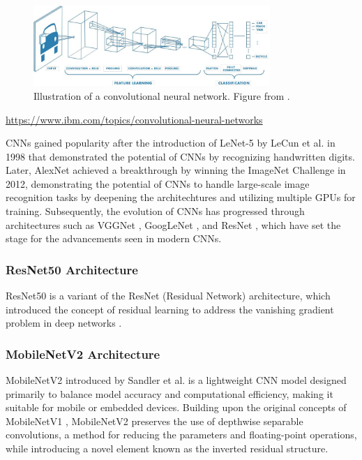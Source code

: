 \begin{figure}[ht]
    \centering
    \includegraphics[width=0.8\textwidth]{Images/CNN_illustration.jpg} 
    \caption{Illustration of a convolutional neural network. Figure from \cite{mathworks_cnn}. }
    \label{fig:cnn_illustration}
\end{figure}

\url{https://www.ibm.com/topics/convolutional-neural-networks}

CNNs gained popularity after the introduction of LeNet-5 by LeCun et al. in 1998 \cite{lecun1998} that demonstrated the potential of CNNs by recognizing handwritten digits. Later, AlexNet \cite{NIPS2012_c399862d} achieved a breakthrough by winning the ImageNet Challenge in 2012, demonstrating the potential of CNNs to handle large-scale image recognition tasks by deepening the architechtures and utilizing multiple GPUs for training. Subsequently, the evolution of CNNs has progressed through architectures such as VGGNet \cite{simonyan2015deepconvolutionalnetworkslargescale}, GoogLeNet \cite{szegedy2014goingdeeperconvolutions}, and ResNet \cite{he2016}, which have set the stage for the advancements seen in modern CNNs.


\subsubsection{ResNet50 Architecture}
\label{sec:resnet}
ResNet50 is a variant of the ResNet (Residual Network) architecture, which introduced the concept of residual learning to address the vanishing gradient problem in deep networks \cite{he2016}. 




\subsubsection{MobileNetV2 Architecture}
\label{sec:mobilenet}
MobileNetV2 introduced by Sandler et al. \cite{sandler2018mobilenetv2} is a lightweight CNN model designed primarily to balance model accuracy and computational efficiency, making it suitable for mobile or embedded devices. Building upon the original concepts of MobileNetV1 \cite{howard2017mobilenetsefficientconvolutionalneural}, MobileNetV2 preserves the use of depthwise separable convolutions, a method for reducing the parameters and floating-point operations, while introducing a novel element known as the inverted residual structure. 

